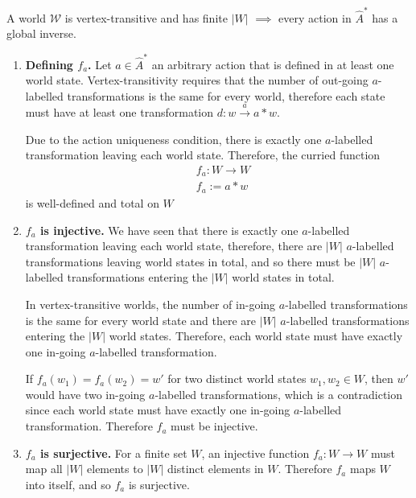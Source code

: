 \begin{propositionE}\label{prp:vertex_transitive_finite_world_has_global_inverses}
     A world $\mathscr{W}$ is vertex-transitive and has finite $|W|$ $\implies$ every action in $\hat{A}^{*}$ has a global inverse.
\end{propositionE}
\begin{proofE}
\begin{enumerate}[(1)]
    \item \textbf{Defining $f_{a}$.}
    Let $a \in \hat{A}^{*}$ an arbitrary action that is defined in at least one world state.
    Vertex-transitivity requires that the number of out-going $a$-labelled transformations is the same for every world, therefore each state must have at least one transformation $d : w \xrightarrow{a} a \ast w$.

    Due to the action uniqueness condition, there is exactly one $a$-labelled transformation leaving each world state.
    Therefore, the curried function
    \begin{equation}
    \begin{aligned}
        & f_{a}: W \to W \\
        & f_{a} := a \ast w
    \end{aligned}
    \end{equation}
    is well-defined and total on $W$

    \item \textbf{$f_{a}$ is injective.}
    We have seen that there is exactly one $a$-labelled transformation leaving each world state, therefore, there are $|W|$ $a$-labelled transformations leaving world states in total, and so there must be $|W|$ $a$-labelled transformations entering the $|W|$ world states in total.

    In vertex-transitive worlds, the number of in-going $a$-labelled transformations is the same for every world state and there are $|W|$ $a$-labelled transformations entering the $|W|$ world states.
    Therefore, each world state must have exactly one in-going $a$-labelled transformation.

    If $f_{a}(w_{1}) = f_{a}(w_{2}) = w'$ for two distinct world states $w_{1}, w_{2} \in W$, then $w'$ would have two in-going $a$-labelled transformations, which is a contradiction since each world state must have exactly one in-going $a$-labelled transformation.
    Therefore $f_{a}$ must be injective.

    \item \textbf{$f_{a}$ is surjective.}
    For a finite set $W$, an injective function $f_{a}: W \to W$ must map all $|W|$ elements to $|W|$ distinct elements in $W$.
    Therefore $f_{a}$ maps $W$ into itself, and so $f_{a}$ is surjective.


\end{enumerate}
\end{proofE}
